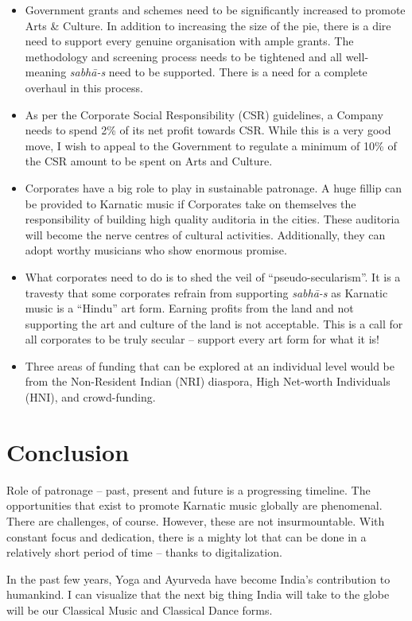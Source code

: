 \begin{itemize}
 \item Government grants and schemes need to be significantly increased to promote Arts \& Culture. In addition to increasing the size of the pie, there is a dire need to support every genuine organisation with ample grants. The methodology and screening process needs to be tightened and all well-meaning \textit{sabhā-s} need to be supported. There is a need for a complete overhaul in this process.

 \item As per the Corporate Social Responsibility (CSR) guidelines, a Company needs to spend 2\% of its net profit towards CSR. While this is a very good move, I wish to appeal to the Government to regulate a minimum of 10\% of the CSR amount to be spent on Arts and Culture.

 \item Corporates have a big role to play in sustainable patronage. A huge fillip can be provided to Karnatic music if Corporates take on themselves the responsibility of building high quality auditoria in the cities. These auditoria will become the nerve centres of cultural activities. Additionally, they can adopt worthy musicians who show enormous promise.

 \item What corporates need to do is to shed the veil of “pseudo-secularism”. It is a travesty that some corporates refrain from supporting \textit{sabhā-s} as Karnatic music is a “Hindu” art form. Earning profits from the land and not supporting the art and culture of the land is not acceptable. This is a call for all corporates to be truly secular – support every art form for what it is!

 \item Three areas of funding that can be explored at an individual level would be from the Non-Resident Indian (NRI) diaspora, High Net-worth Individuals (HNI), and crowd-funding.

\end{itemize}


\section*{Conclusion}

Role of patronage – past, present and future is a progressing timeline. The opportunities that exist to promote Karnatic music globally are phenomenal. There are challenges, of course. However, these are not insurmountable. With constant focus and dedication, there is a mighty lot that can be done in a relatively short period of time – thanks to digitalization.

In the past few years, Yoga and Ayurveda have become India’s contribution to humankind. I can visualize that the next big thing India will take to the globe will be our Classical Music and Classical Dance forms.

\theendnotes

